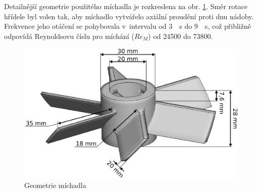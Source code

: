 Detailnější geometrie použitého míchadla je rozkreslena na obr. \ref{fig:imp}. Směr rotace hřídele byl volen tak, aby míchadlo vytvářelo axiální proudění proti dnu nádoby. Frekvence jeho otáčení se pohybovala v~intervalu od \SI{3}{\per\second} do \SI{9}{\per\second}, což přibližně odpovídá Reynoldsovu číslu pro míchání ($Re_{M}$) od \num{24500} do \num{73800}.
\begin{figure}[t]
\centering
\includegraphics[scale=0.35]{images/imp.eps}
\caption{Geometrie míchadla}
\label{fig:imp}
\end{figure} 

